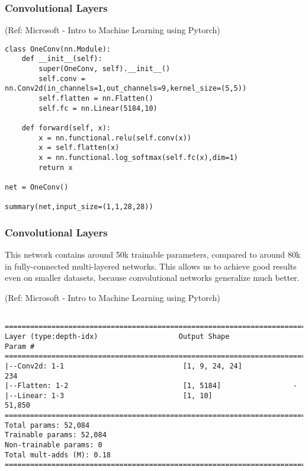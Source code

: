 \begin{frame}[fragile] \frametitle{Convolutional Layers}

\tiny{(Ref: Microsoft - Intro to Machine Learning using Pytorch)}

\begin{lstlisting}
class OneConv(nn.Module):
    def __init__(self):
        super(OneConv, self).__init__()
        self.conv = nn.Conv2d(in_channels=1,out_channels=9,kernel_size=(5,5))
        self.flatten = nn.Flatten()
        self.fc = nn.Linear(5184,10)

    def forward(self, x):
        x = nn.functional.relu(self.conv(x))
        x = self.flatten(x)
        x = nn.functional.log_softmax(self.fc(x),dim=1)
        return x

net = OneConv()

summary(net,input_size=(1,1,28,28))

\end{lstlisting}

\end{frame}

\begin{frame}[fragile] \frametitle{Convolutional Layers}

This network contains around 50k trainable parameters, compared to around 80k in fully-connected multi-layered networks. This allows us to achieve good results even on smaller datasets, because convolutional networks generalize much better.

\tiny{(Ref: Microsoft - Intro to Machine Learning using Pytorch)}

\begin{lstlisting}

==========================================================================
Layer (type:depth-idx)                   Output Shape              Param #
==========================================================================
|--Conv2d: 1-1                            [1, 9, 24, 24]            234
|--Flatten: 1-2                           [1, 5184]                 -
|--Linear: 1-3                            [1, 10]                   51,850
==========================================================================
Total params: 52,084
Trainable params: 52,084
Non-trainable params: 0
Total mult-adds (M): 0.18
==========================================================================
\end{lstlisting}


\end{frame}


